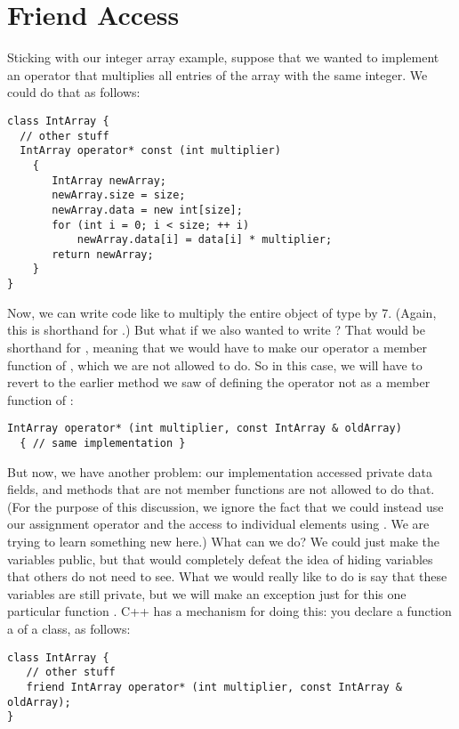 \section{Friend Access}
Sticking with our integer array example, suppose that we wanted to
implement an operator that multiplies all entries of the array with
the same integer. We could do that as follows:
\begin{verbatim}
class IntArray { 
  // other stuff
  IntArray operator* const (int multiplier)
    { 
       IntArray newArray;
       newArray.size = size;
       newArray.data = new int[size];
       for (int i = 0; i < size; ++ i)
           newArray.data[i] = data[i] * multiplier;
       return newArray;
    }
}
\end{verbatim}
Now, we can write code like  to multiply the entire object
of type  by 7. 
(Again, this is shorthand for .)
But what if we also wanted to write ?
That would be shorthand for ,
meaning that we would have to make our operator a member function of ,
which we are not allowed to do.
So in this case, we will have to revert to the earlier method we saw
of defining the operator not as a member function of :

\begin{verbatim}
IntArray operator* (int multiplier, const IntArray & oldArray)
  { // same implementation }
\end{verbatim}

But now, we have another problem:
our implementation accessed private data fields,
and methods that are not member functions are not allowed to do that.
(For the purpose of this discussion, we ignore the fact that we could
instead use our assignment operator and the access to individual
elements using \code{[]}. We are trying to learn something new here.)
What can we do? We could just make the variables public,
but that would completely defeat the idea of hiding variables that
others do not need to see.
What we would really like to do is say that these variables are still
private, but we will make an exception just for this one particular
function .
C++ has a mechanism for doing this:
you declare a function a  of a class, as follows:

\begin{verbatim}
class IntArray {
   // other stuff
   friend IntArray operator* (int multiplier, const IntArray & oldArray);
}
\end{verbatim}

